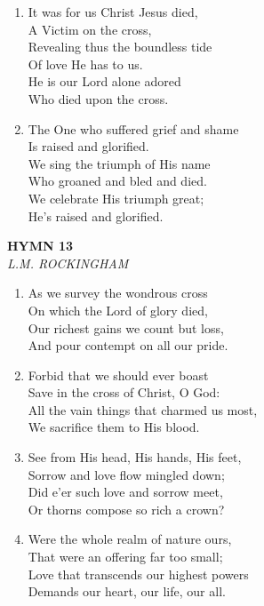 \documentclass[11pt,a4paper]{article}
\begin{document}
\begin{enumerate}
    \item It was for us Christ Jesus died, \\
        A Victim on the cross, \\
        Revealing thus the boundless tide \\
        Of love He has to us. \\
        He is our Lord alone adored \\
        Who died upon the cross.

    \item The One who suffered grief and shame \\
        Is raised and glorified. \\
        We sing the triumph of His name \\
        Who groaned and bled and died. \\
        We celebrate His triumph great; \\
        He's raised and glorified.

\end{enumerate}

\newpage
\begin{center}
    {\Large \textbf{HYMN 13}}
    \\
    \textit{L.M. ROCKINGHAM}
\end{center}
\vspace{1em}

\begin{enumerate}
    \item As we survey the wondrous cross \\
        On which the Lord of glory died, \\
        Our richest gains we count but loss, \\
        And pour contempt on all our pride.

    \item Forbid that we should ever boast \\
        Save in the cross of Christ, O God: \\
        All the vain things that charmed us most, \\
        We sacrifice them to His blood.

    \item See from His head, His hands, His feet, \\
        Sorrow and love flow mingled down; \\
        Did e'er such love and sorrow meet, \\
        Or thorns compose so rich a crown?

    \item Were the whole realm of nature ours, \\
        That were an offering far too small; \\
        Love that transcends our highest powers \\
        Demands our heart, our life, our all.

\end{enumerate}
\end{document}
